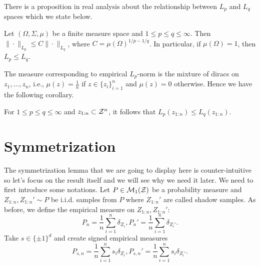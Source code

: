 \documentclass[twoside]{article}
\begin{document}
There is a proposition in real analysis about the relationship between $L_p$ and $L_q$ spaces which we state below.
\begin{proposition}
   Let $(\Omega, \Sigma, \mu)$ be a finite measure space and $1\le p\le q\le \infty$. Then $\|\cdot\|_{L_p}\le C\|\cdot\|_{L_q}$, where $C=\mu(\Omega)^{1/p-1/q}$. In particular, if $\mu(\Omega)=1$, then $L_p\le L_q$.
\end{proposition}
The measure corresponding to empirical $L_p$-norm is the mixture of diracs on $z_1,...,z_n$, i.e., $\mu(z)=\frac{1}{n}$ if $z\in \{z_i\}_{i=1}^n $ and $\mu(z)=0$ otherwise. Hence we have the following corollary.
\begin{corollary}
   For $1\le p\le q\le \infty$ and $z_{1:n}\subset \mathcal{Z}^n$, it follows that $L_p(z_{1:n})\le L_q(z_{1:n})$.
\end{corollary}

\section{Symmetrization}
The symmetrization lemma that we are going to display here is counter-intuitive so let's focus on the result itself and we will see why we need it later. We need to first introduce some notations. Let $P\in \mathcal{M}_1(\mathcal{Z})$ be a probability measure and $Z_{1:n}, Z_{1:n}'\sim P$ be i.i.d. samples from $P$ where $Z_{1:n}'$ are called shadow samples. 
As before, we define the empirical measure on $Z_{1:n}, Z_{1:n}'$: \[P_n=\frac{1}{n}\sum_{i=1}^n \delta_{Z_i}, P_n'=\frac{1}{n}\sum_{i=1}^n \delta_{Z_i'}.\]
Take $s\in \{\pm 1\}^d$ and create signed empirical measures \[P_{s,n}=\frac{1}{n}\sum_{i=1}^n s_i\delta_{Z_i}, P_{s,n}'=\frac{1}{n}\sum_{i=1}^ns_i\delta_{Z_i'}.\]
\end{document}
